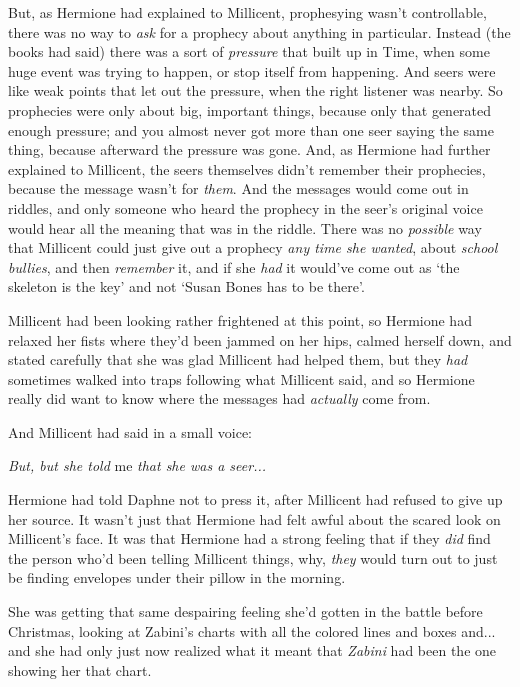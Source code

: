 But, as Hermione had explained to Millicent, prophesying wasn't controllable, there was no way to \emph{ask} for a prophecy about anything in particular. Instead (the books had said) there was a sort of \emph{pressure} that built up in Time, when some huge event was trying to happen, or stop itself from happening. And seers were like weak points that let out the pressure, when the right listener was nearby. So prophecies were only about big, important things, because only that generated enough pressure; and you almost never got more than one seer saying the same thing, because afterward the pressure was gone. And, as Hermione had further explained to Millicent, the seers themselves didn't remember their prophecies, because the message wasn't for \emph{them}. And the messages would come out in riddles, and only someone who heard the prophecy in the seer's original voice would hear all the meaning that was in the riddle. There was no \emph{possible} way that Millicent could just give out a prophecy \emph{any time she wanted}, about \emph{school bullies}, and then \emph{remember} it, and if she \emph{had} it would've come out as `the skeleton is the key' and not `Susan Bones has to be there'.

Millicent had been looking rather frightened at this point, so Hermione had relaxed her fists where they'd been jammed on her hips, calmed herself down, and stated carefully that she was glad Millicent had helped them, but they \emph{had} sometimes walked into traps following what Millicent said, and so Hermione really did want to know where the messages had \emph{actually} come from.

And Millicent had said in a small voice:

\emph{But, but she told} me \emph{that she was a seer...}

Hermione had told Daphne not to press it, after Millicent had refused to give up her source. It wasn't just that Hermione had felt awful about the scared look on Millicent's face. It was that Hermione had a strong feeling that if they \emph{did} find the person who'd been telling Millicent things, why, \emph{they} would turn out to just be finding envelopes under their pillow in the morning.

She was getting that same despairing feeling she'd gotten in the battle before Christmas, looking at Zabini's charts with all the colored lines and boxes and... and she had only just now realized what it meant that \emph{Zabini} had been the one showing her that chart.

